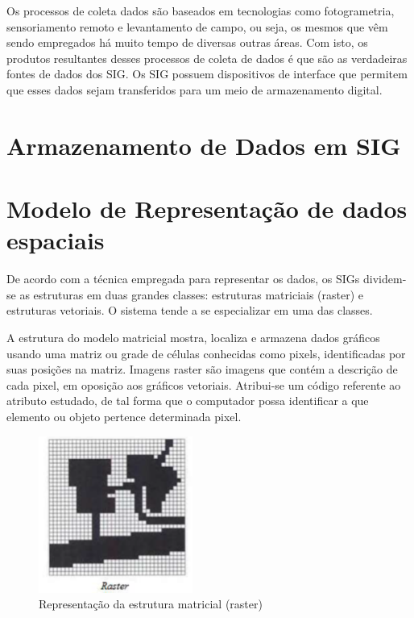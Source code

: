 \documentclass[
	12pt,				%
    oneside,			%
	a4paper,			%
	english,			%
	french,				%
	spanish,			%
	brazil,				%
	]{abntex2}
\begin{document}
Os processos de coleta dados são baseados em tecnologias como fotogrametria, sensoriamento remoto e levantamento de campo, ou seja, os mesmos que vêm sendo empregados há muito tempo de diversas outras áreas. Com isto, os produtos resultantes desses processos de coleta de dados é que são as verdadeiras fontes de dados dos SIG. Os SIG possuem dispositivos de interface que permitem que esses dados sejam transferidos para um meio de armazenamento digital. 


\section{Armazenamento de Dados em SIG}

\section{Modelo de Representação de dados espaciais}
De acordo com a técnica empregada para representar os dados, os SIGs dividem-se as estruturas em duas grandes classes: estruturas matriciais (raster) e estruturas vetoriais. O sistema tende a se especializar em uma das classes. 

A estrutura do modelo matricial mostra, localiza e armazena dados gráficos usando uma matriz ou grade de células conhecidas como pixels, identificadas por suas posições na matriz. Imagens raster são imagens que contém a descrição de cada pixel, em oposição aos gráficos vetoriais. Atribui-se um código referente ao atributo estudado, de tal forma que o computador possa identificar a que elemento ou objeto pertence determinada pixel.

\begin{figure} [H] 
\label{figura1} 
\caption{Representação da estrutura matricial (raster)}
\includegraphics[width=0.45\textwidth]{raster.png} %
\end{figure}
\end{document}
